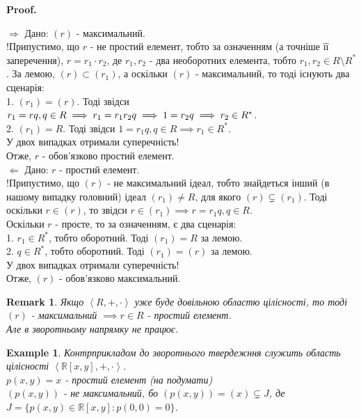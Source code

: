 \documentclass[a4paper, 10pt]{article}
\makeatletter
\theoremstyle{theoremdd}
\theoremstyle{theoremdd}
\theoremstyle{theoremdd}
\theoremstyle{theoremdd}
\theoremstyle{theoremdd}
\newtheorem{example}[theorem]{Example}
\theoremstyle{theoremdd}
\theoremstyle{theoremdd}
\theoremstyle{theoremdd}
\theoremstyle{theoremdd}
\theoremstyle{theoremdd}
\theoremstyle{theoremdd}
\newtheorem{remark}[theorem]{Remark}
\theoremstyle{theoremdd}
\theoremstyle{theoremdd}
\theoremstyle{theoremdd}
\theoremstyle{theoremdd}
\renewenvironment{proof}[1][Proof.\\]{\par
\pushQED{\hfill \qed}%
\normalfont \topsep6\p@\@plus6\p@\relax
\trivlist
\item\relax
{\bfseries
#1\@addpunct{.}}\hspace\labelsep\ignorespaces
}{%
\popQED\endtrivlist\@endpefalse
}
\makeatother
\begin{document}
\begin{proof}
$\boxed{\Rightarrow}$ Дано: $(r)$ - максимальний.\\
!Припустимо, що $r$ - не простий елемент, тобто за означенням (а точніше її заперечення), $r = r_1 \cdot r_2$, де $r_1,r_2$ - два необоротних елемента, тобто $r_1,r_2 \in R \setminus R^*$. За лемою, $(r) \subset (r_1)$, а оскільки $(r)$ - максимальний, то тоді існують два сценарія:\\
1. $(r_1) = (r)$. Тоді звідси $r_1 = rq, q \in R \implies r_1 = r_1r_2q \implies 1 = r_2q \\ \implies r_2 \in R^*$.\\
2. $(r_1) = R$. Тоді звідси $1 = r_1q, q \in R \implies r_1 \in R^*$.\\
У двох випадках отримали суперечність!\\
Отже, $r$ - обов'язково простий елемент.
\bigskip \\
$\boxed{\Leftarrow}$ Дано: $r$ - простий елемент.\\
!Припустимо, що $(r)$ - не максимальний ідеал, тобто знайдеться інший (в нашому випадку головний) ідеал $(r_1) \neq R$, для якого $(r) \subsetneq (r_1)$. Тоді оскільки $r \in (r)$, то звідси $r \in (r_1) \implies r = r_1q, q \in R$.\\
Оскільки $r$ - просте, то за означенням, є два сценарія:\\
1. $r_1 \in R^*$, тобто оборотний. Тоді $(r_1) = R$ за лемою.\\
2. $q \in R^*$, тобто оборотний. Тоді $(r_1) = (r)$ за лемою.\\
У двох випадках отримали суперечність!\\
Отже, $(r)$ - обов'язково максимальний.
\end{proof}

\begin{remark}
Якщо $\left<R,+,\cdot \right>$ уже буде довільною областю цілісності, то тоді
$(r)$ - максимальний $\implies r \in R$ - простий елемент.\\
Але в зворотньому напрямку не працює.
\end{remark}

\begin{example}
Контрприкладом до зворотнього твердежння служить область цілісності $\left< \mathbb{R}[x,y], +, \cdot \right>$.\\
$p(x,y) = x$ - простий елемент (\textit{на подумати})\\
$(p(x,y))$ - не максимальний, бо $(p(x,y)) = (x) \subsetneq J$, де \\ $J = \{p(x,y) \in \mathbb{R}[x,y]: p(0,0) =0\}$.
\end{example}
\end{document}
